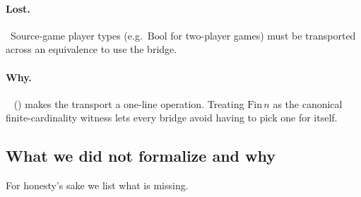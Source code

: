 \paragraph{Lost.}\ Source-game player types (e.g.\
$\mathrm{Bool}$ for two-player games) must be transported across
an equivalence \TT{Bool $\simeq$ Fin 2} to use the bridge.

\paragraph{Why.}\ 
() makes the transport a
one-line operation.  Treating $\mathrm{Fin}\,n$ as the canonical
finite-cardinality witness lets every bridge avoid having to
pick one for itself.

\subsection{What we did not formalize and why}
\label{sec:discussion:scope}

For honesty's sake we list what is missing.

